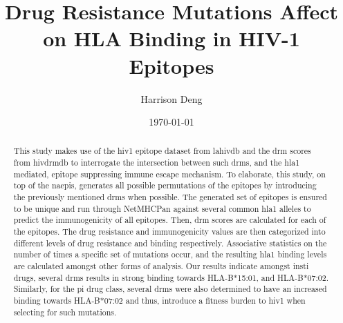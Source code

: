 \documentclass[11pt, letterpaper]{article}
\title{Drug Resistance Mutations Affect on HLA Binding in HIV-1 Epitopes}
\author{Harrison Deng}
\date{\today}
\begin{document}
\maketitle

\begin{abstract}
    This study makes use of the \acl{hiv1} epitope dataset from \acl{lahivdb} and the \acl{drm} scores from \acl{hivdrmdb} to interrogate the intersection between such \acsp{drm}, and the \acl{hla1} mediated, epitope suppressing immune escape mechanism. To elaborate, this study, on top of the \aclp{naepi}, generates all possible permutations of the epitopes by introducing the previously mentioned \aclp{drm} when possible. The generated set of epitopes is ensured to be unique and run through NetMHCPan \cite{reynissonNetMHCpan4NetMHCIIpan4Improved2020} against several common \acl{hla1} alleles to predict the immunogenicity of all epitopes. Then, \acl{drm} scores are calculated for each of the epitopes. The drug resistance and immunogenicity values are then categorized into different levels of drug resistance and binding respectively. Associative statistics on the number of times a specific set of mutations occur, and the resulting \acl{hla1} binding levels are calculated amongst other forms of analysis. Our results indicate amongst \acl{insti} drugs, several \aclp{drm} results in strong binding towards HLA-B*15:01, and HLA-B*07:02. Similarly, for the \acl{pi} drug class, several \aclp{drm} were also determined to have an increased binding towards HLA-B*07:02 and thus, introduce a fitness burden to \acl{hiv1} when selecting for such mutations.
\end{abstract}

\newpage
\tableofcontents







\newpage
\printacronyms[heading=section]
\newpage
\printbibliography[heading=bibnumbered]
\end{document}
